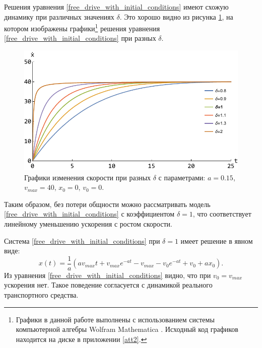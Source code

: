 \documentclass[12pt, a4paper]{extarticle}
\numberwithin{equation}{section}
\numberwithin{figure}{section}
\begin{document}
Решения уравнения \eqref{free_drive_with_initial_conditions} имеют схожую динамику при различных значениях $\delta$. Это хорошо видно из рисунка \ref{free_drive_with_delta}, на котором изображены графики\footnote{Графики в данной работе выполнены с использованием системы компьютерной алгебры Wolfram Mathematica \cite{WolframMathematica}. Исходный код графиков находится на диске в приложении \ref{att2}.} решения уравнения \eqref{free_drive_with_initial_conditions} при разных $\delta$.

\begin{figure}[h!]
	\begin{center}
		\begin{minipage}[h!]{0.48\linewidth}
			\includegraphics[width=1\linewidth,height=0.2\textheight]
			{Images/free_drive_speed_with_different_delta.pdf}
		\end{minipage}
		\caption{Графики изменения скорости при разных $\delta$ с параметрами: $a=0.15$, $v_{max}=40$, $x_0=0$, $v_0=0$.}
		\label{free_drive_with_delta}
	\end{center}
\end{figure}

Таким образом, без потери общности можно рассматривать модель \eqref{free_drive_with_initial_conditions} с коэффициентом $\delta=1$, что соответствует линейному уменьшению ускорения с ростом скорости.

Система \eqref{free_drive_with_initial_conditions} при $\delta=1$ имеет решение в явном виде:
\begin{equation*}
x(t) =\dfrac{1}{a}\left(av_{max}t+v_{max}e^{-at}-v_{max}-v_0e^{-at}+v_0+ax_0\right).
\end{equation*}
Из уравнения \eqref{free_drive_with_initial_conditions} видно, что при $v_0=v_{max}$ ускорения нет. Такое поведение согласуется с динамикой реального транспортного средства.
\end{document}
